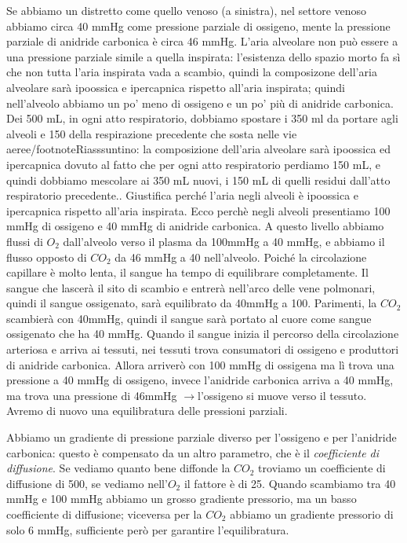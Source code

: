 \documentclass[a4paper,12pt]{article}
\newcommand{\lfreccia}{\ensuremath{\longrightarrow}}
\begin{document}
Se abbiamo un distretto come quello venoso (a sinistra), nel settore venoso abbiamo circa 40 mmHg come pressione parziale di ossigeno, mente la pressione parziale di anidride carbonica è circa 46 mmHg. L'aria alveolare non può essere a una pressione parziale simile a quella inspirata: l'esistenza dello spazio morto fa sì che non tutta l'aria inspirata vada a scambio, quindi la composizone dell'aria alveolare sarà ipoossica e ipercapnica rispetto all'aria inspirata; quindi nell'alveolo abbiamo un po' meno di ossigeno e un po' più di anidride carbonica. Dei 500 mL, in ogni atto respiratorio, dobbiamo spostare i 350 ml da portare agli alveoli e 150 della respirazione precedente che sosta nelle vie aeree/footnote{Riasssuntino: la composizione dell'aria alveolare sarà ipoossica ed ipercapnica dovuto al fatto che per ogni atto respiratorio perdiamo 150 mL, e quindi dobbiamo mescolare ai 350 mL nuovi, i 150 mL di quelli residui dall'atto respiratorio precedente.}. Giustifica perché l'aria negli alveoli è ipoossica e ipercapnica rispetto all'aria inspirata. Ecco perchè negli alveoli presentiamo 100 mmHg di ossigeno e 40 mmHg di anidride carbonica. A questo livello abbiamo flussi di $O_{2}$ dall'alveolo verso il plasma da 100mmHg a 40 mmHg, e abbiamo il flusso opposto di $CO_{2}$ da 46 mmHg a 40 nell'alveolo. Poiché la circolazione capillare è molto lenta, il sangue ha tempo di equilibrare completamente. Il sangue che lascerà il sito di scambio e entrerà nell'arco delle vene polmonari, quindi il sangue ossigenato, sarà equilibrato da 40mmHg a 100. Parimenti, la $CO_{2}$ scambierà con 40mmHg, quindi il sangue sarà portato al cuore come sangue ossigenato che ha 40 mmHg. Quando il sangue inizia il percorso della circolazione arteriosa e arriva ai tessuti, nei tessuti trova consumatori di ossigeno e produttori di anidride carbonica. Allora arriverò con 100 mmHg di ossigena ma lì trova una pressione a 40 mmHg di ossigeno, invece l'anidride carbonica arriva a 40 mmHg, ma trova una pressione di 46mmHg \lfreccia l'ossigeno si muove verso il tessuto. Avremo di nuovo una equilibratura delle pressioni parziali. 

Abbiamo un gradiente di pressione parziale diverso per l'ossigeno e per l'anidride carbonica: questo è compensato da un altro parametro, che è il \emph{coefficiente di diffusione}. Se vediamo quanto bene diffonde la $CO_{2}$ troviamo un coefficiente di diffusione di 500, se vediamo nell'$O_{2}$ il fattore è di 25. Quando scambiamo tra 40 mmHg e 100 mmHg abbiamo un grosso gradiente pressorio, ma un basso coefficiente di diffusione; viceversa per la $CO_{2}$ abbiamo un gradiente pressorio di solo 6 mmHg, sufficiente però per garantire l'equilibratura. 
\end{document}
